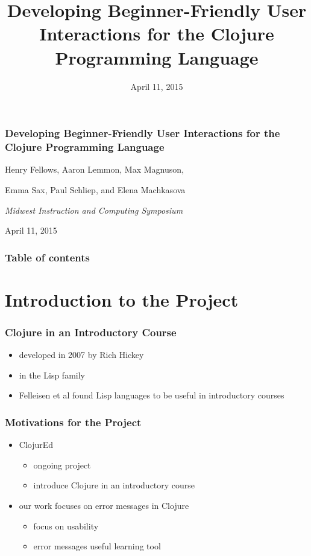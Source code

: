 \documentclass{beamer}
\begin{document}
\title{Developing Beginner-Friendly User Interactions for the Clojure Programming Language}
\date{April 11, 2015}

\begin{frame}
\frametitle{Developing Beginner-Friendly User Interactions for the Clojure Programming Language}
{\centering
\noindent
Henry Fellows, Aaron Lemmon, Max Magnuson, \par
Emma Sax, Paul Schliep, and Elena Machkasova \par

{\it 
Midwest Instruction and Computing Symposium\par
April 11, 2015\par}
}
\end{frame}

\begin{frame}
\frametitle{Table of contents}
\tableofcontents  
\end{frame}

\section{Introduction to the Project}
\begin{frame}
	\frametitle{Clojure in an Introductory Course}
	\begin{itemize}
		\item developed in 2007 by Rich Hickey
		\item in the Lisp family
		\item Felleisen et al found Lisp languages to be useful in introductory courses
	\end{itemize}
\end{frame}

\begin{frame}
\frametitle{Motivations for the Project}
	\begin{itemize}
		\item ClojurEd
			\begin{itemize}
				\item ongoing project
				\item introduce Clojure in an introductory course
			\end{itemize}
		\item our work focuses on error messages in Clojure
			\begin{itemize}
				\item focus on usability
				\item error messages useful learning tool
			\end{itemize}
	\end{itemize}
\end{frame}
\end{document}
